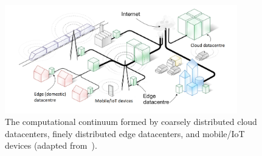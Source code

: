 \begin{figure}[tbp]
	\includegraphics[width=0.9\textwidth]{figs/Continuum-overall.png}
	\caption{The computational continuum formed by coarsely distributed cloud datacenters, finely distributed edge datacenters, and mobile/IoT devices (adapted from~\cite{Tarneberg2017}).}
	\label{fig:continuum-overral}
\end{figure}

 




